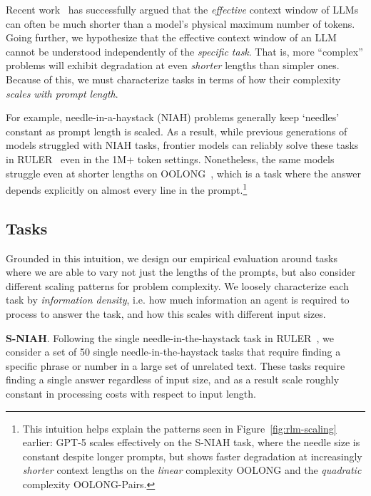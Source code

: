 Recent work~\citep{hsieh2024rulerwhatsrealcontext, goldman2025reallylongcontextneed, hong2025contextrot} has successfully argued that the \textit{effective} context window of LLMs can often be much shorter than a model's physical maximum number of tokens. Going further, we hypothesize that the effective context window of an LLM cannot be understood independently of the \textit{specific task}. That is, more ``complex'' problems will exhibit degradation at even \textit{shorter} lengths than simpler ones. Because of this, we must characterize tasks in terms of how their complexity \textit{scales with prompt length}.

For example, needle-in-a-haystack (NIAH) problems generally keep `needles' constant as prompt length is scaled. As a result, while previous generations of models struggled with NIAH tasks, frontier models can reliably solve these tasks in RULER~\citep{hsieh2024rulerwhatsrealcontext} even in the 1M+ token settings. Nonetheless, the same models struggle even at shorter lengths on OOLONG~\citep{bertsch2025oolongevaluatinglongcontext}, which is a task where the answer depends explicitly on almost every line in the prompt.\footnote{This intuition helps explain the patterns seen in Figure~\ref{fig:rlm-scaling} earlier: GPT-5 scales effectively on the S-NIAH task, where the needle size is constant despite longer prompts, but shows faster degradation at increasingly \textit{shorter} context lengths on the \textit{linear} complexity OOLONG and the \textit{quadratic} complexity OOLONG-Pairs.}










\subsection{Tasks}
\label{sec4.1-experimental-setup}
Grounded in this intuition, we design our empirical evaluation around tasks where we are able to vary not just the lengths of the prompts, but also consider different scaling patterns for problem complexity. We loosely characterize each task by \textit{information density}, i.e. how much information an agent is required to process to answer the task, and how this scales with different input sizes.



\textbf{S-NIAH}. Following the single needle-in-the-haystack task in RULER~\citep{hsieh2024rulerwhatsrealcontext}, we consider a set of 50 single needle-in-the-haystack tasks that require finding a specific phrase or number in a large set of unrelated text. These tasks require finding a single answer regardless of input size, and as a result scale roughly constant in processing costs with respect to input length.

